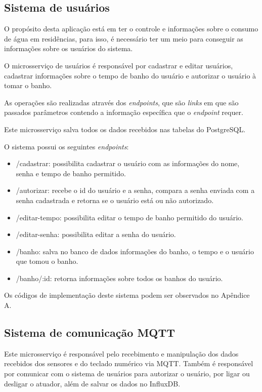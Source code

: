 \subsection{Sistema de usuários}

O propósito desta aplicação está em ter o controle e informações sobre o consumo de água em residências, para isso, é necessário ter um meio para conseguir as informações sobre os usuários do sistema. 

O microsserviço de usuários é responsável por cadastrar e editar usuários, cadastrar informações sobre o tempo de banho do usuário e autorizar o usuário à tomar o banho.

As operações são realizadas através dos \textit{endpoints}, que são \textit{links} em que são passados parâmetros contendo a informação específica que o \textit{endpoint} requer.

Este microsserviço salva todos os dados recebidos nas tabelas do PostgreSQL.

O sistema possui os seguintes \textit{endpoints}:


\begin{itemize}
	\item /cadastrar: possibilita cadastrar o usuário com as informações do nome, senha e tempo de banho permitido.
	\item /autorizar: recebe o id do usuário e a senha, compara a senha enviada com a senha cadastrada e retorna se o usuário está ou não autorizado.
	\item /editar-tempo: possibilita editar o tempo de banho permitido do usuário.
	\item /editar-senha: possibilita editar a senha do usuário.
	\item /banho: salva no banco de dados informações do banho, o tempo e o usuário que tomou o banho.
	\item /banho/:id: retorna informações sobre todos os banhos do usuário.
\end{itemize}

Os códigos de implementação deste sistema podem ser observados no Apêndice A.

\subsection{Sistema de comunicação MQTT}

Este microsserviço é responsável pelo recebimento e manipulação dos dados recebidos dos sensores e do teclado numérico via MQTT. Também é responsável por comunicar com o sistema de usuários para autorizar o usuário, por ligar ou desligar o atuador, além de salvar os dados no InfluxDB.

